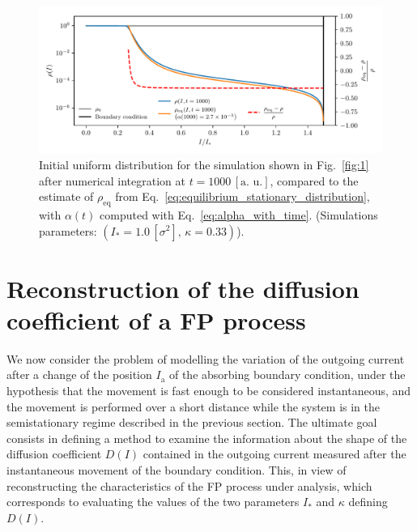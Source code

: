\begin{figure}[htp]
    \centering
    \includegraphics[width=\textwidth]{4_probing_the_diffusive_behavior/figs/final/new_stationary_distribution_s.pdf}
    \caption{Initial uniform distribution for the simulation shown in Fig.~\ref{fig:1} after numerical integration at $t=1000 \, [\text{a. u.}]$, compared to the estimate of $\rho_\mathrm{eq}$ from Eq.~\eqref{eq:equilibrium_stationary_distribution}, with $\alpha(t)$ computed with Eq.~\eqref{eq:alpha_with_time}. (Simulations parameters: $(I_\ast = 1.0\,[\sigma^2],\, \kappa = 0.33)$).}
    \label{fig:3}
\end{figure}


\section{Reconstruction of the diffusion coefficient of a FP process}
\label{sec:moving_the_absorbing_barrier}


We now consider the problem of modelling the variation of the outgoing current after a change of the position $I_\mathrm{a}$ of the absorbing boundary condition, under the hypothesis that the movement is fast enough to be considered instantaneous, and the movement is performed over a short distance while the system is in the semistationary regime described in the previous section. The ultimate goal consists in defining a method to examine the information about the shape of the diffusion coefficient $D(I)$ contained in the outgoing current measured after the instantaneous movement of the boundary condition. This, in view of reconstructing the characteristics of the FP process under analysis, which corresponds to evaluating the values of the two parameters $I_\ast$ and $\kappa$ defining $D(I)$.

